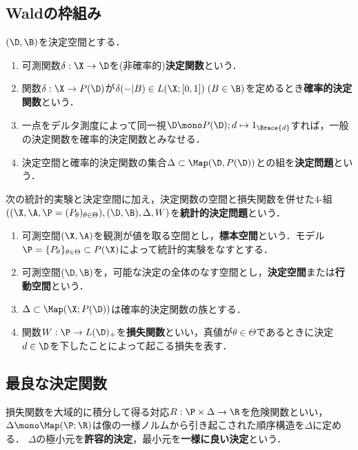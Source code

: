 \documentclass[uplatex,dvipdfmx]{jsreport}
\begin{document}
\subsection{Waldの枠組み}

\begin{definition}
    $(\D,\B)$を決定空間とする．
    \begin{enumerate}
        \item 可測関数$\delta:\X\to\D$を(非確率的)\textbf{決定関数}という．
        \item 関数$\delta:\X\to P(\D)$が$\delta(-|B)\in L(\X;[0,1])\;(B\in\B)$を定めるとき\textbf{確率的決定関数}という．
        \item 一点をデルタ測度によって同一視$\D\mono P(\D);d\mapsto 1_{\Brace{d}}$すれば，一般の決定関数を確率的決定関数とみなせる．
        \item 決定空間と確率的決定関数の集合$\Delta\subset\Map(\D,P(\D))$との組を\textbf{決定問題}という．
    \end{enumerate}
\end{definition}

\begin{model}
    次の統計的実験と決定空間に加え，決定関数の空間と損失関数を併せた4-組$((\X,\A,\P=(P_\theta)_{\theta\in\Theta}),(\D,\B),\Delta,W)$を\textbf{統計的決定問題}という．
    \begin{enumerate}
        \item 可測空間$(\X,\A)$を観測が値を取る空間とし，\textbf{標本空間}という．モデル$\P=\{P_\theta\}_{\theta\in\Theta}\subset P(\X)$によって統計的実験をなすとする．
        \item 可測空間$(\D,\B)$を，可能な決定の全体のなす空間とし，\textbf{決定空間}または\textbf{行動空間}という．
        \item $\Delta\subset\Map(\X;P(\D))$は確率的決定関数の族とする．
        \item 関数$W:\P\to L(\D)_+$を\textbf{損失関数}といい，真値が$\theta\in\Theta$であるときに決定$d\in\D$を下したことによって起こる損失を表す．
    \end{enumerate}
\end{model}

\subsection{最良な決定関数}

\begin{tcolorbox}[colframe=ForestGreen, colback=ForestGreen!10!white,breakable,colbacktitle=ForestGreen!40!white,coltitle=black,fonttitle=\bfseries\sffamily,
    title=]
    損失関数を大域的に積分して得る対応$R:\P\times\Delta\to\R$を危険関数といい，$\Delta\mono\Map(\P;\R)$は像の一様ノルムから引き起こされた順序構造を$\Delta$に定める．
    $\Delta$の極小元を\textbf{許容的決定}，最小元を\textbf{一様に良い決定}という．
\end{tcolorbox}
\end{document}
